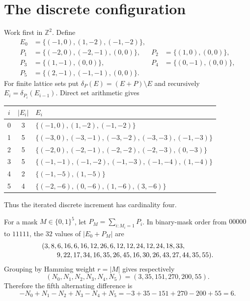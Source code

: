 \documentclass[11pt]{article}
\newcommand{\Z}{\mathbb Z}
\newcommand{\card}[1]{\lvert#1\rvert}
\begin{document}
\section*{The discrete configuration}
Work first in $\Z^2$.  Define
\begin{align*}
 E_0&=\{(-1,0),(1,-2),(-1,-2)\},\\
 P_1&=\{(-2,0),(-2,-1),(0,0)\},&
 P_2&=\{(1,0),(0,0)\},\\
 P_3&=\{(1,-1),(0,0)\},&
 P_4&=\{(0,-1),(0,0)\},\\
 P_5&=\{(2,-1),(-1,-1),(0,0)\}.&&
\end{align*}
For finite lattice sets put $\delta_P(E)=(E+P)\setminus E$ and recursively
$E_i=\delta_{P_i}(E_{i-1})$.  Direct set arithmetic gives
\begin{center}
\small
\begin{tabular}{ccl}
\toprule
$i$ & $\card{E_i}$ & $E_i$\\
\midrule
0&3&$\{(-1,0),(1,-2),(-1,-2)\}$\\
1&5&$\{(-3,0),(-3,-1),(-3,-2),(-3,-3),(-1,-3)\}$\\
2&5&$\{(-2,0),(-2,-1),(-2,-2),(-2,-3),(0,-3)\}$\\
3&5&$\{(-1,-1),(-1,-2),(-1,-3),(-1,-4),(1,-4)\}$\\
4&2&$\{(-1,-5),(1,-5)\}$\\
5&4&$\{(-2,-6),(0,-6),(1,-6),(3,-6)\}$\\
\bottomrule
\end{tabular}
\end{center}
Thus the iterated discrete increment has cardinality four.

For a mask $M\in\{0,1\}^5$, let
$P_M=\sum_{i:M_i=1}P_i$.  In binary-mask order from $00000$ to $11111$,
the $32$ values of $\card{E_0+P_M}$ are
\begin{align*}
 &(3,8,6,16,6,16,12,26,6,12,12,24,12,24,18,33,\\[-0.2em]
 &\hspace{2.2em}9,22,17,34,16,35,26,45,16,30,26,43,27,44,35,55).
\end{align*}
Grouping by Hamming weight $r=|M|$ gives respectively
\[
 (N_0,N_1,N_2,N_3,N_4,N_5)=(3,35,151,270,200,55).
\]
Therefore the fifth alternating difference is
\begin{equation}\label{six}
 -N_0+N_1-N_2+N_3-N_4+N_5
 =-3+35-151+270-200+55=6.                              \tag{1}
\end{equation}
\end{document}
